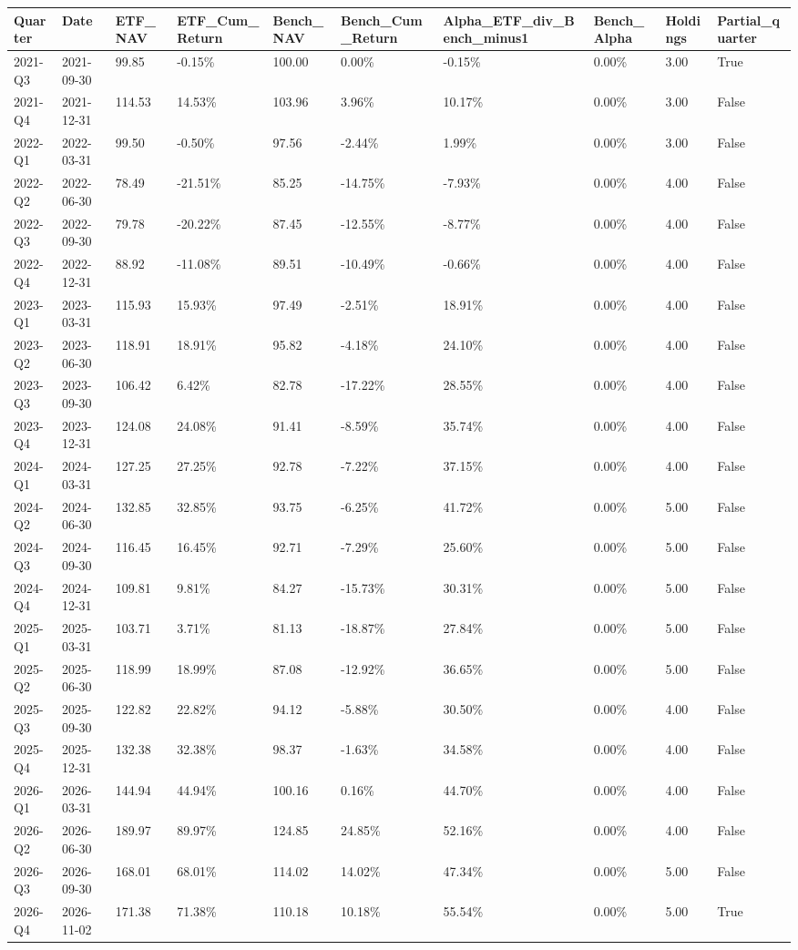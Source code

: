 \begin{longtable}{llllllllll}
Quarter & Date & ETF\_NAV & ETF\_Cum\_Return & Bench\_NAV & Bench\_Cum\_Return & Alpha\_ETF\_div\_Bench\_minus1 & Bench\_Alpha & Holdings & Partial\_quarter \\
\hline
2021-Q3 & 2021-09-30 & 99.85 & -0.15\% & 100.00 & 0.00\% & -0.15\% & 0.00\% & 3.00 & True \\
2021-Q4 & 2021-12-31 & 114.53 & 14.53\% & 103.96 & 3.96\% & 10.17\% & 0.00\% & 3.00 & False \\
2022-Q1 & 2022-03-31 & 99.50 & -0.50\% & 97.56 & -2.44\% & 1.99\% & 0.00\% & 3.00 & False \\
2022-Q2 & 2022-06-30 & 78.49 & -21.51\% & 85.25 & -14.75\% & -7.93\% & 0.00\% & 4.00 & False \\
2022-Q3 & 2022-09-30 & 79.78 & -20.22\% & 87.45 & -12.55\% & -8.77\% & 0.00\% & 4.00 & False \\
2022-Q4 & 2022-12-31 & 88.92 & -11.08\% & 89.51 & -10.49\% & -0.66\% & 0.00\% & 4.00 & False \\
2023-Q1 & 2023-03-31 & 115.93 & 15.93\% & 97.49 & -2.51\% & 18.91\% & 0.00\% & 4.00 & False \\
2023-Q2 & 2023-06-30 & 118.91 & 18.91\% & 95.82 & -4.18\% & 24.10\% & 0.00\% & 4.00 & False \\
2023-Q3 & 2023-09-30 & 106.42 & 6.42\% & 82.78 & -17.22\% & 28.55\% & 0.00\% & 4.00 & False \\
2023-Q4 & 2023-12-31 & 124.08 & 24.08\% & 91.41 & -8.59\% & 35.74\% & 0.00\% & 4.00 & False \\
2024-Q1 & 2024-03-31 & 127.25 & 27.25\% & 92.78 & -7.22\% & 37.15\% & 0.00\% & 4.00 & False \\
2024-Q2 & 2024-06-30 & 132.85 & 32.85\% & 93.75 & -6.25\% & 41.72\% & 0.00\% & 5.00 & False \\
2024-Q3 & 2024-09-30 & 116.45 & 16.45\% & 92.71 & -7.29\% & 25.60\% & 0.00\% & 5.00 & False \\
2024-Q4 & 2024-12-31 & 109.81 & 9.81\% & 84.27 & -15.73\% & 30.31\% & 0.00\% & 5.00 & False \\
2025-Q1 & 2025-03-31 & 103.71 & 3.71\% & 81.13 & -18.87\% & 27.84\% & 0.00\% & 5.00 & False \\
2025-Q2 & 2025-06-30 & 118.99 & 18.99\% & 87.08 & -12.92\% & 36.65\% & 0.00\% & 5.00 & False \\
2025-Q3 & 2025-09-30 & 122.82 & 22.82\% & 94.12 & -5.88\% & 30.50\% & 0.00\% & 4.00 & False \\
2025-Q4 & 2025-12-31 & 132.38 & 32.38\% & 98.37 & -1.63\% & 34.58\% & 0.00\% & 4.00 & False \\
2026-Q1 & 2026-03-31 & 144.94 & 44.94\% & 100.16 & 0.16\% & 44.70\% & 0.00\% & 4.00 & False \\
2026-Q2 & 2026-06-30 & 189.97 & 89.97\% & 124.85 & 24.85\% & 52.16\% & 0.00\% & 4.00 & False \\
2026-Q3 & 2026-09-30 & 168.01 & 68.01\% & 114.02 & 14.02\% & 47.34\% & 0.00\% & 5.00 & False \\
2026-Q4 & 2026-11-02 & 171.38 & 71.38\% & 110.18 & 10.18\% & 55.54\% & 0.00\% & 5.00 & True \\
\end{longtable}
